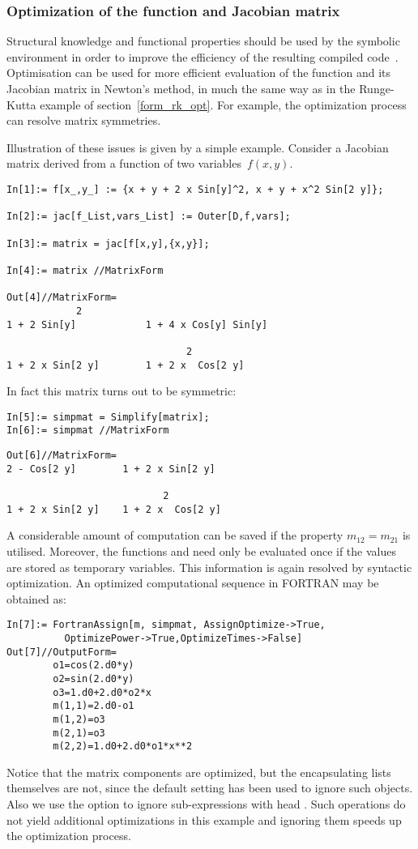 \documentclass [12pt,twoside]{article}
\begin{document}
\subsubsection{Optimization of the function and Jacobian matrix}

Structural knowledge and functional properties should be used by the symbolic
environment in order to improve the efficiency of the resulting compiled
code~\cite{mutrie}. Optimisation can be used for more efficient evaluation of the
function and its Jacobian matrix in Newton's method, in much the same way as in
the Runge-Kutta example of section~\ref{form_rk_opt}. For example, the
optimization process can resolve matrix symmetries.

Illustration of these issues is given by a simple example. Consider a Jacobian
matrix derived from a function of two variables~$f(x,y)$.
\begin{verbatim}
In[1]:= f[x_,y_] := {x + y + 2 x Sin[y]^2, x + y + x^2 Sin[2 y]};

In[2]:= jac[f_List,vars_List] := Outer[D,f,vars];

In[3]:= matrix = jac[f[x,y],{x,y}];

In[4]:= matrix //MatrixForm

Out[4]//MatrixForm=
            2
1 + 2 Sin[y]            1 + 4 x Cos[y] Sin[y]

                               2
1 + 2 x Sin[2 y]        1 + 2 x  Cos[2 y]
\end{verbatim}
\pagebreak[2]
In fact this matrix turns out to be symmetric:
\pagebreak[2]
\begin{verbatim}
In[5]:= simpmat = Simplify[matrix];
In[6]:= simpmat //MatrixForm
\end{verbatim}
\begin{verbatim}
Out[6]//MatrixForm=
2 - Cos[2 y]        1 + 2 x Sin[2 y]

                           2
1 + 2 x Sin[2 y]    1 + 2 x  Cos[2 y]
\end{verbatim}
A considerable amount of computation can be saved if the property
$m_{12}=m_{21}$ is utilised. Moreover, the functions  and
 need only be evaluated once if the values are stored as temporary
variables. This information is again resolved by syntactic optimization. An
optimized computational sequence in FORTRAN may be obtained as:
 
\begin{verbatim}
In[7]:= FortranAssign[m, simpmat, AssignOptimize->True,
          OptimizePower->True,OptimizeTimes->False]
Out[7]//OutputForm=
        o1=cos(2.d0*y)
        o2=sin(2.d0*y)
        o3=1.d0+2.d0*o2*x
        m(1,1)=2.d0-o1
        m(1,2)=o3
        m(2,1)=o3
        m(2,2)=1.d0+2.d0*o1*x**2
\end{verbatim}
Notice that the matrix components are optimized, but the encapsulating lists
themselves are not, since the default setting  has
been used to ignore such objects. Also we use the option
 to ignore sub-expressions with head .
Such operations do not yield additional optimizations in this example and
ignoring them speeds up the optimization process.
\end{document}
